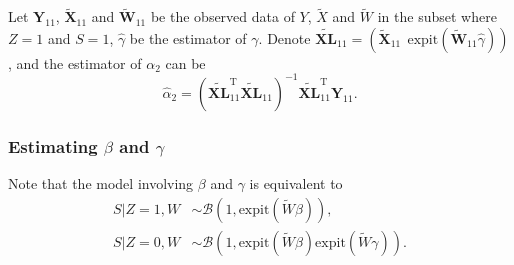 \documentclass[article]{jss}
\def\expit{\mathrm{expit}}
\newcommand{\transpose}[1]{#1^{\mathrm{T}}}
\begin{document}
Let $\mathbf{Y}_{11}$, $\widetilde{\mathbf{X}}_{11}$ and $\widetilde{\mathbf{W}}_{11}$ be the observed data of $Y$, $\widetilde{X}$ and $\widetilde{W}$ in the subset where $Z=1$ and $S=1$, $\widehat{\gamma}$ be the estimator of $\gamma$. Denote $\widetilde{\mathbf{XL}}_{11}=\left(\widetilde{\mathbf{X}}_{11}~~\expit(\widetilde{\mathbf{W}}_{11}\widehat{\gamma})\right)$, and the estimator of $\alpha_2$ can be
%
\begin{equation}
\widehat{\alpha}_2=(\transpose{\widetilde{\mathbf{XL}}_{11}}\widetilde{\mathbf{XL}}_{11})^{-1}\transpose{\widetilde{\mathbf{XL}}_{11}}\mathbf{Y}_{11}.
\end{equation}
%

\subsubsection{Estimating $\beta$ and $\gamma$}
Note that the model involving $\beta$ and $\gamma$ is equivalent to 
\begin{equation}
  \begin{aligned}
    S|Z=1,W&\sim \mathcal{B}(1,\expit(\widetilde{W}\beta)),\\
    S|Z=0,W&\sim \mathcal{B}(1,\expit(\widetilde{W}\beta)\expit(\widetilde{W}\gamma)).
  \end{aligned}
\end{equation}
\end{document}
